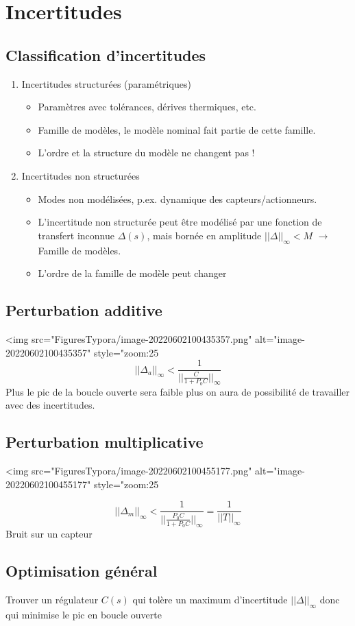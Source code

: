 \documentclass[resume]{subfiles}
\begin{document}
\section{Incertitudes}

\subsection{Classification d'incertitudes}
\begin{enumerate}
\item Incertitudes structurées (paramétriques)
	\begin{itemize}
	\item Paramètres avec tolérances, dérives thermiques, etc.
	\item Famille de modèles, le modèle nominal fait partie de cette famille.
	\item L'ordre et la structure du modèle ne changent pas !
	\end{itemize}
\item Incertitudes non structurées
	\begin{itemize}
	\item Modes non modélisées, p.ex. dynamique des capteurs/actionneurs.
	\item L'incertitude non structurée peut être modélisé par une fonction de transfert inconnue $\Delta(s)$, mais bornée en amplitude $||\Delta||_{\infty}< M$ $\rightarrow$ Famille de modèles.
   \item L'ordre de la famille de modèle peut changer
   \end{itemize}
\end{enumerate}

\subsection{Perturbation additive}

<img src="FiguresTypora/image-20220602100435357.png" alt="image-20220602100435357" style="zoom:25%
$$
||\Delta_a||_{\infty} < \frac{1}{||\frac{C}{1+P_0C}||_{\infty}}
$$
Plus le pic de la boucle ouverte sera faible plus on aura de possibilité de travailler avec des incertitudes.

\subsection{Perturbation multiplicative}

<img src="FiguresTypora/image-20220602100455177.png" alt="image-20220602100455177" style="zoom:25%

$$||\Delta_m||_{\infty} < \frac{1}{||\frac{P_0C}{1+P_0C}||_{\infty}}= \frac{1}{||T||_{\infty}}$$
Bruit sur un capteur

\subsection{Optimisation général}

Trouver un régulateur $C(s)$ qui tolère un maximum d'incertitude $||\Delta||_{\infty}$ donc qui minimise le pic en boucle ouverte 
\end{document}
